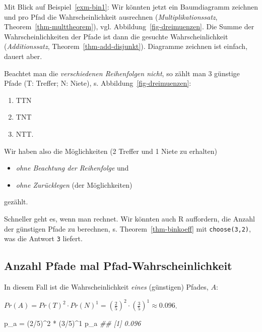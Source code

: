 \documentclass[
  ngerman,
  letterpaper,
  twoside,
  open=any]{scrbook}
\newenvironment{Shaded}{\begin{snugshade}}{\end{snugshade}}
\newcommand{\DecValTok}[1]{\textcolor[rgb]{0.68,0.00,0.00}{#1}}
\newcommand{\DocumentationTok}[1]{\textcolor[rgb]{0.37,0.37,0.37}{\textit{#1}}}
\newcommand{\NormalTok}[1]{\textcolor[rgb]{0.00,0.23,0.31}{#1}}
\newcommand{\OtherTok}[1]{\textcolor[rgb]{0.00,0.23,0.31}{#1}}
\newcommand{\SpecialCharTok}[1]{\textcolor[rgb]{0.37,0.37,0.37}{#1}}
\providecommand{\tightlist}{%
  \setlength{\itemsep}{0pt}\setlength{\parskip}{0pt}}\usepackage{longtable,booktabs,array}
\theoremstyle{definition}
\theoremstyle{plain}
\theoremstyle{definition}
\theoremstyle{definition}
\theoremstyle{definition}
\theoremstyle{definition}
\theoremstyle{remark}
\begin{document}
Mit Blick auf Beispiel~\ref{exm-bin1}: Wir könnten jetzt ein
Baumdiagramm zeichnen und pro Pfad die Wahrscheinlichkeit ausrechnen
(\emph{Multiplikationssatz}, Theorem~\ref{thm-multtheorem}), vgl.
Abbildung~\ref{fig-dreimuenzen}. Die Summe der Wahrscheinlichkeiten der
Pfade ist dann die gesuchte Wahrscheinlichkeit (\emph{Additionssatz},
Theorem~\ref{thm-add-disjunkt}). Diagramme zeichnen ist einfach, dauert
aber.

Beachtet man die \emph{verschiedenen Reihenfolgen nicht}, so zählt man 3
günstige Pfade (T: Treffer; N: Niete), s.
Abbildung~\ref{fig-dreimuenzen}:

\begin{enumerate}
\def\labelenumi{\arabic{enumi}.}
\tightlist
\item
  TTN
\item
  TNT
\item
  NTT.
\end{enumerate}

Wir haben also die Möglichkeiten (2 Treffer und 1 Niete zu erhalten)

\begin{itemize}
\tightlist
\item
  \emph{ohne Beachtung der Reihenfolge} und
\item
  \emph{ohne Zurücklegen} (der Möglichkeiten)
\end{itemize}

gezählt.

Schneller geht es, wenn man rechnet. Wir könnten auch R auffordern, die
Anzahl der günstigen Pfade zu berechnen, s. Theorem~\ref{thm-binkoeff}
mit \texttt{choose(3,2)}, was die Antwort \texttt{3} liefert.

\subsection{Anzahl Pfade mal
Pfad-Wahrscheinlichkeit}\label{anzahl-pfade-mal-pfad-wahrscheinlichkeit}

In diesem Fall ist die Wahrscheinlichkeit \emph{eines} (günstigen)
Pfades, \(A\):

\(Pr(A) = Pr(T)^2 \cdot Pr(N)^1 = \left( \frac{2}{5} \right)^2 \cdot \left( \frac{3}{5} \right)^1 \approx 0.096\).

\begin{Shaded}
\begin{Highlighting}[]
\NormalTok{p\_a }\OtherTok{=}\NormalTok{ (}\DecValTok{2}\SpecialCharTok{/}\DecValTok{5}\NormalTok{)}\SpecialCharTok{\^{}}\DecValTok{2} \SpecialCharTok{*}\NormalTok{ (}\DecValTok{3}\SpecialCharTok{/}\DecValTok{5}\NormalTok{)}\SpecialCharTok{\^{}}\DecValTok{1}
\NormalTok{p\_a}
\DocumentationTok{\#\# [1] 0.096}
\end{Highlighting}
\end{Shaded}
\end{document}
